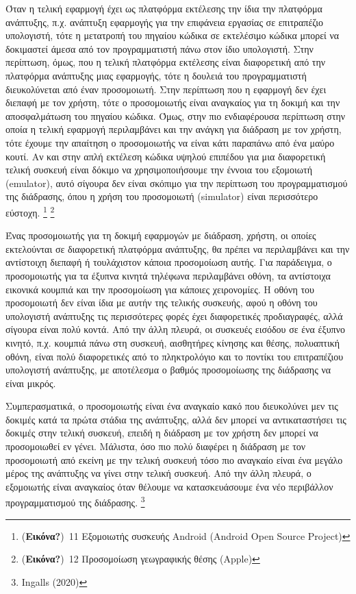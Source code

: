 \documentclass[
]{article}
\begin{document}
Όταν η τελική εφαρμογή έχει ως πλατφόρμα εκτέλεσης την ίδια την
πλατφόρμα ανάπτυξης, π.χ. ανάπτυξη εφαρμογής για την επιφάνεια εργασίας
σε επιτραπέζιο υπολογιστή, τότε η μετατροπή του πηγαίου κώδικα σε
εκτελέσιμο κώδικα μπορεί να δοκιμαστεί άμεσα από τον προγραμματιστή πάνω
στον ίδιο υπολογιστή. Στην περίπτωση, όμως, που η τελική πλατφόρμα
εκτέλεσης είναι διαφορετική από την πλατφόρμα ανάπτυξης μιας εφαρμογής,
τότε η δουλειά του προγραμματιστή διευκολύνεται από έναν προσομοιωτή.
Στην περίπτωση που η εφαρμογή δεν έχει διεπαφή με τον χρήστη, τότε ο
προσομοιωτής είναι αναγκαίος για τη δοκιμή και την αποσφαλμάτωση του
πηγαίου κώδικα. Όμως, στην πιο ενδιαφέρουσα περίπτωση στην οποία η
τελική εφαρμογή περιλαμβάνει και την ανάγκη για διάδραση με τον χρήστη,
τότε έχουμε την απαίτηση ο προσομοιωτής να είναι κάτι παραπάνω από ένα
μαύρο κουτί. Αν και στην απλή εκτέλεση κώδικα υψηλού επιπέδου για μια
διαφορετική τελική συσκευή είναι δόκιμο να χρησιμοποιήσουμε την έννοια
του εξομοιωτή (emulator), αυτό σίγουρα δεν είναι σκόπιμο για την
περίπτωση του προγραμματισμού της διάδρασης, όπου η χρήση του
προσομοιωτή (simulator) είναι περισσότερο εύστοχη. \footnote{(\textbf{Εικόνα?})~11
  Εξομοιωτής συσκευής Android (Android Open Source Project)} \footnote{(\textbf{Εικόνα?})~12
  Προσομοίωση γεωγραφικής θέσης (Apple)}

Ένας προσομοιωτής για τη δοκιμή εφαρμογών με διάδραση, χρήστη, οι οποίες
εκτελούνται σε διαφορετική πλατφόρμα ανάπτυξης, θα πρέπει να
περιλαμβάνει και την αντίστοιχη διεπαφή ή τουλάχιστον κάποια προσομοίωση
αυτής. Για παράδειγμα, ο προσομοιωτής για τα έξυπνα κινητά τηλέφωνα
περιλαμβάνει οθόνη, τα αντίστοιχα εικονικά κουμπιά και την προσομοίωση
για κάποιες χειρονομίες. Η οθόνη του προσομοιωτή δεν είναι ίδια με αυτήν
της τελικής συσκευής, αφού η οθόνη του υπολογιστή ανάπτυξης τις
περισσότερες φορές έχει διαφορετικές προδιαγραφές, αλλά σίγουρα είναι
πολύ κοντά. Από την άλλη πλευρά, οι συσκευές εισόδου σε ένα έξυπνο
κινητό, π.χ. κουμπιά πάνω στη συσκευή, αισθητήρες κίνησης και θέσης,
πολυαπτική οθόνη, είναι πολύ διαφορετικές από το πληκτρολόγιο και το
ποντίκι του επιτραπέζιου υπολογιστή ανάπτυξης, με αποτέλεσμα ο βαθμός
προσομοίωσης της διάδρασης να είναι μικρός.

Συμπερασματικά, ο προσομοιωτής είναι ένα αναγκαίο κακό που διευκολύνει
μεν τις δοκιμές κατά τα πρώτα στάδια της ανάπτυξης, αλλά δεν μπορεί να
αντικαταστήσει τις δοκιμές στην τελική συσκευή, επειδή η διάδραση με τον
χρήστη δεν μπορεί να προσομοιωθεί εν γένει. Μάλιστα, όσο πιο πολύ
διαφέρει η διάδραση με τον προσομοιωτή από εκείνη με την τελική συσκευή
τόσο πιο αναγκαίο είναι ένα μεγάλο μέρος της ανάπτυξης να γίνει στην
τελική συσκευή. Από την άλλη πλευρά, ο εξομοιωτής είναι αναγκαίος όταν
θέλουμε να κατασκευάσουμε ένα νέο περιβάλλον προγραμματισμού της
διάδρασης. \footnote{Ingalls (2020)}
\end{document}
